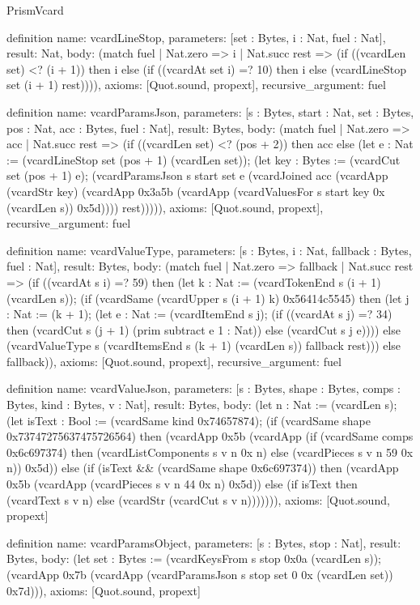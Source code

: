 \begin{lexlean}{PrismVcard}
\begin{semanticmodule}
definition{
  name: vcardLineStop,
  parameters: [set : Bytes, i : Nat, fuel : Nat],
  result: Nat,
  body: (match fuel
    | Nat.zero => i
    | Nat.succ rest => (if ((vcardLen set) <? (i + 1)) then i else (if ((vcardAt set i) =? 10) then i else (vcardLineStop set (i + 1) rest)))),
  axioms: [Quot.sound, propext],
  recursive_argument: fuel
}

definition{
  name: vcardParamsJson,
  parameters: [s : Bytes, start : Nat, set : Bytes, pos : Nat, acc : Bytes, fuel : Nat],
  result: Bytes,
  body: (match fuel
    | Nat.zero => acc
    | Nat.succ rest => (if ((vcardLen set) <? (pos + 2)) then acc else (let e : Nat := (vcardLineStop set (pos + 1) (vcardLen set)); (let key : Bytes := (vcardCut set (pos + 1) e); (vcardParamsJson s start set e (vcardJoined acc (vcardApp (vcardStr key) (vcardApp 0x3a5b (vcardApp (vcardValuesFor s start key 0x (vcardLen s)) 0x5d)))) rest))))),
  axioms: [Quot.sound, propext],
  recursive_argument: fuel
}

definition{
  name: vcardValueType,
  parameters: [s : Bytes, i : Nat, fallback : Bytes, fuel : Nat],
  result: Bytes,
  body: (match fuel
    | Nat.zero => fallback
    | Nat.succ rest => (if ((vcardAt s i) =? 59) then (let k : Nat := (vcardTokenEnd s (i + 1) (vcardLen s)); (if (vcardSame (vcardUpper s (i + 1) k) 0x56414c5545) then (let j : Nat := (k + 1); (let e : Nat := (vcardItemEnd s j); (if ((vcardAt s j) =? 34) then (vcardCut s (j + 1) (prim subtract e 1 : Nat)) else (vcardCut s j e)))) else (vcardValueType s (vcardItemsEnd s (k + 1) (vcardLen s)) fallback rest))) else fallback)),
  axioms: [Quot.sound, propext],
  recursive_argument: fuel
}

definition{
  name: vcardValueJson,
  parameters: [s : Bytes, shape : Bytes, comps : Bytes, kind : Bytes, v : Nat],
  result: Bytes,
  body: (let n : Nat := (vcardLen s); (let isText : Bool := (vcardSame kind 0x74657874); (if (vcardSame shape 0x73747275637475726564) then (vcardApp 0x5b (vcardApp (if (vcardSame comps 0x6c697374) then (vcardListComponents s v n 0x n) else (vcardPieces s v n 59 0x n)) 0x5d)) else (if (isText && (vcardSame shape 0x6c697374)) then (vcardApp 0x5b (vcardApp (vcardPieces s v n 44 0x n) 0x5d)) else (if isText then (vcardText s v n) else (vcardStr (vcardCut s v n))))))),
  axioms: [Quot.sound, propext]
}

definition{
  name: vcardParamsObject,
  parameters: [s : Bytes, stop : Nat],
  result: Bytes,
  body: (let set : Bytes := (vcardKeysFrom s stop 0x0a (vcardLen s)); (vcardApp 0x7b (vcardApp (vcardParamsJson s stop set 0 0x (vcardLen set)) 0x7d))),
  axioms: [Quot.sound, propext]
}


\end{semanticmodule}
\end{lexlean}
